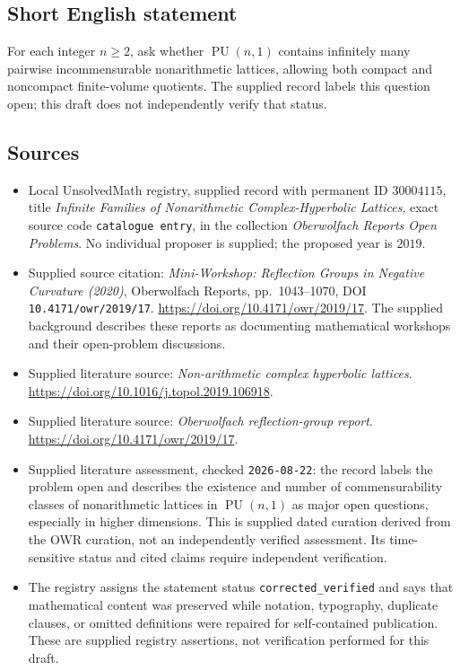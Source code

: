 \documentclass[11pt]{article}
\begin{document}
\subsection{Short English statement}
For each integer \(n\geq 2\), ask whether \(\operatorname{PU}(n,1)\) contains infinitely many pairwise incommensurable nonarithmetic lattices, allowing both compact and noncompact finite-volume quotients. The supplied record labels this question open; this draft does not independently verify that status.
\subsection{Sources}
\begin{itemize}
\item Local UnsolvedMath registry, supplied record with permanent ID \(30004115\), title \emph{Infinite Families of Nonarithmetic Complex-Hyperbolic Lattices}, exact source code \texttt{catalogue entry}, in the collection \emph{Oberwolfach Reports Open Problems}. No individual proposer is supplied; the proposed year is \(2019\).
\item Supplied source citation: \emph{Mini-Workshop: Reflection Groups in Negative Curvature (2020)}, Oberwolfach Reports, pp.\ 1043--1070, DOI \texttt{10.4171/owr/2019/17}. \url{https://doi.org/10.4171/owr/2019/17}. The supplied background describes these reports as documenting mathematical workshops and their open-problem discussions.
\item Supplied literature source: \emph{Non-arithmetic complex hyperbolic lattices}. \url{https://doi.org/10.1016/j.topol.2019.106918}.
\item Supplied literature source: \emph{Oberwolfach reflection-group report}. \url{https://doi.org/10.4171/owr/2019/17}.
\item Supplied literature assessment, checked \texttt{2026-08-22}: the record labels the problem open and describes the existence and number of commensurability classes of nonarithmetic lattices in \(\operatorname{PU}(n,1)\) as major open questions, especially in higher dimensions. This is supplied dated curation derived from the OWR curation, not an independently verified assessment. Its time-sensitive status and cited claims require independent verification.
\item The registry assigns the statement status \texttt{corrected\_verified} and says that mathematical content was preserved while notation, typography, duplicate clauses, or omitted definitions were repaired for self-contained publication. These are supplied registry assertions, not verification performed for this draft.
\end{itemize}
\end{document}
